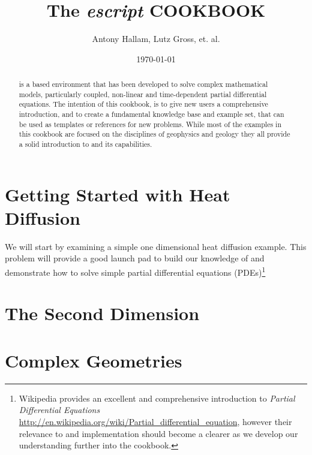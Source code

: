 \documentclass{manual}
\title{The \textit{escript} COOKBOOK}
\author{Antony Hallam, Lutz Gross, et. al.}
\date{\today}
\begin{document}
\maketitle

\ifpdf
{}
\fi



\begin{abstract}
\esc is a \pyt based environment that has been developed to solve complex mathematical models, particularly coupled, non-linear and time-dependent partial differential equations. The intention of this cookbook, is to give new \esc users a comprehensive introduction, and to create a fundamental knowledge base and example set, that can be used as templates or references for new problems. While most of the examples in this cookbook are focused on the disciplines of geophysics and geology they all provide a solid introduction to \esc and its capabilities.
\end{abstract}
\tableofcontents

\newpage




\chapter{Getting Started with Heat Diffusion}
\label{CHAP HEAT DIFF}
We will start by examining a simple one dimensional heat diffusion example. This problem will provide a good launch pad to build our knowledge of \esc and demonstrate how to solve simple partial differential equations (PDEs)\footnote{Wikipedia provides an excellent and comprehensive introduction to \textit{Partial Differential Equations} \url{http://en.wikipedia.org/wiki/Partial_differential_equation}, however their relevance to \esc and implementation should become a clearer as we develop our understanding further into the cookbook.}



\chapter{The Second Dimension}
\label{CHAP HEAT 2a}



\chapter{Complex Geometries}
\label{CHAP HEAT 2}


% 


\end{document}
